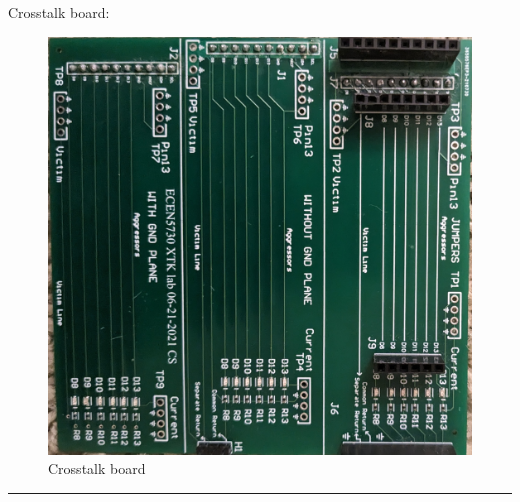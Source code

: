 \documentclass[a4paper,11pt]{article}%
\begin{document}
Crosstalk board:

\begin{figure}[H]
	\centering
	\includegraphics[scale=0.2]{figures/crosstalk.jpg}
	\caption{Crosstalk board}
	\label{crosstalk}
\end{figure}

\hrule






\end{document}
